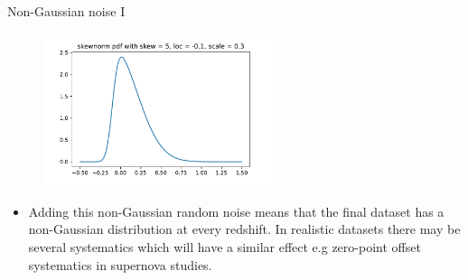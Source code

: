 \documentclass{beamer}
\theoremstyle{remark}
\newcommand{\nologo}{\setbeamertemplate{logo}{}} %
\begin{document}
{\nologo
\begin{frame}{Non-Gaussian noise I}
\begin{figure}[H]
    \centering
    \includegraphics[width=0.6\textwidth]{skewnorm.pdf}
\end{figure}
\begin{itemize}%
    \item Adding this non-Gaussian random noise means that the final dataset has a non-Gaussian distribution at every redshift. In realistic datasets there may be several systematics which will have a similar effect e.g zero-point offset systematics in supernova studies.
\end{itemize}
\end{frame}
}
\end{document}
